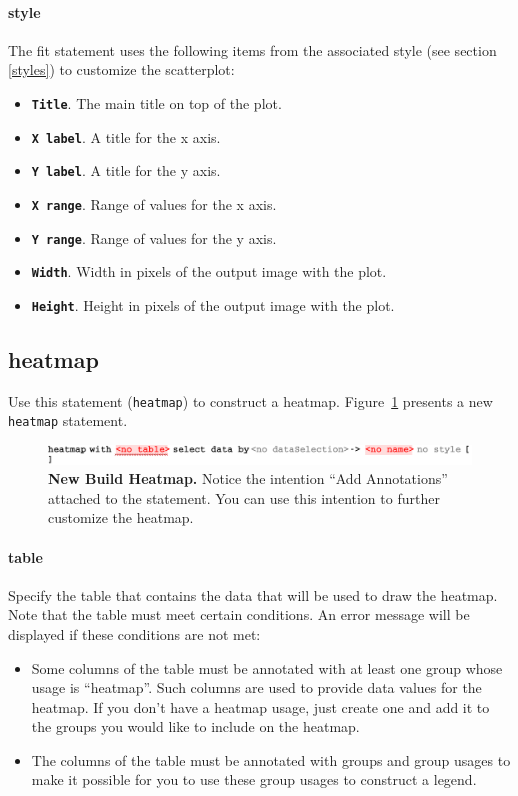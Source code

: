 \paragraph{style}
The fit statement uses the following items from the associated style (see section \ref{styles}) to customize the scatterplot:
\begin{itemize}
\item \textbf{ \texttt{Title}}. The main title on top of the plot.
\item \textbf{ \texttt{X label}}. A title for the x axis.
\item \textbf{ \texttt{Y label}}. A title for the y axis.
\item \textbf{ \texttt{X range}}. Range of values for the x axis.
\item \textbf{ \texttt{Y range}}. Range of values for the y axis.
\item \textbf{ \texttt{Width}}. Width in pixels of the output image with the plot.
\item \textbf{ \texttt{Height}}. Height in pixels of the output image with the plot. 
\end{itemize}

\subsection{heatmap}
Use this statement (\texttt{heatmap}) to construct a heatmap. Figure~\ref{fig:NewBuildHeatmap} presents a new \texttt{heatmap} statement.

\begin{figure}[h!tbp]
  \centering
  \includegraphics[width=\figWidthWide]{figures/NewBuildHeatmap.pdf}
\caption[New Heatmap.]{\textbf{New Build Heatmap.} Notice the intention ``Add Annotations'' attached to the statement. You can use this intention to further customize the heatmap.}
\label{fig:NewBuildHeatmap}
\end{figure}

\paragraph{table}
Specify the table that contains the data that will be used to draw the heatmap. Note that the table must meet certain conditions. An error message will be displayed if these conditions are not met:

\begin{itemize}
  \item Some columns of the table must be annotated with at least one group whose usage is ``heatmap''. Such columns are used to provide data values for the heatmap. If you don't have a heatmap usage, just create one and add it to the groups you would like to include on the heatmap.
  \item The columns of the table must be annotated with groups and group usages to make it possible for you to use these group usages to construct a legend.
\end{itemize}

